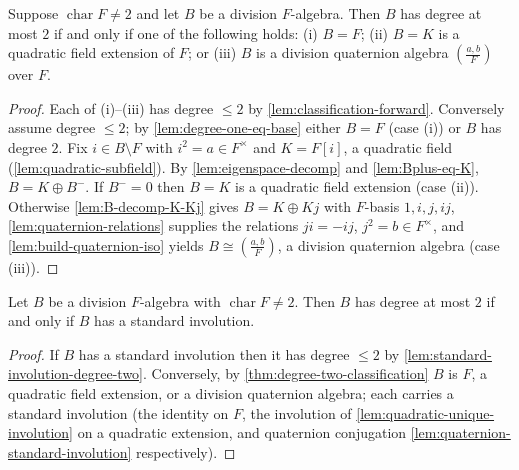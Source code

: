 \begin{theorem}
    \label{thm:degree-two-classification}
    Suppose $\operatorname{char} F \neq 2$ and let $B$ be a division $F$-algebra.
    Then $B$ has degree at most $2$ if and only if one of the following holds:
    (i) $B = F$; (ii) $B = K$ is a quadratic field extension of $F$; or
    (iii) $B$ is a division quaternion algebra $\left(\frac{a,b}{F}\right)$ over
    $F$.
\end{theorem}
\begin{proof}
    Each of (i)--(iii) has degree $\leq 2$ by \ref{lem:classification-forward}.
    Conversely assume degree $\leq 2$; by
    \ref{lem:degree-one-eq-base} either $B = F$ (case (i)) or $B$ has degree $2$.
    Fix $i \in B\setminus F$ with $i^2 = a \in F^\times$ and $K = F[i]$, a quadratic
    field (\ref{lem:quadratic-subfield}). By \ref{lem:eigenspace-decomp} and
    \ref{lem:Bplus-eq-K}, $B = K \oplus B^{-}$. If $B^{-} = 0$ then $B = K$ is a
    quadratic field extension (case (ii)). Otherwise \ref{lem:B-decomp-K-Kj} gives
    $B = K \oplus Kj$ with $F$-basis $1, i, j, ij$, \ref{lem:quaternion-relations}
    supplies the relations $ji = -ij$, $j^2 = b \in F^\times$, and
    \ref{lem:build-quaternion-iso} yields $B \cong \left(\frac{a,b}{F}\right)$, a
    division quaternion algebra (case (iii)).
\end{proof}

\begin{corollary}
    \label{cor:degree-two-iff-involution}
    Let $B$ be a division $F$-algebra with $\operatorname{char} F \neq 2$. Then
    $B$ has degree at most $2$ if and only if $B$ has a standard involution.
\end{corollary}
\begin{proof}
    If $B$ has a standard involution then it has degree $\leq 2$ by
    \ref{lem:standard-involution-degree-two}. Conversely, by
    \ref{thm:degree-two-classification} $B$ is $F$, a quadratic field extension,
    or a division quaternion algebra; each carries a standard involution (the
    identity on $F$, the involution of \ref{lem:quadratic-unique-involution} on a
    quadratic extension, and quaternion conjugation
    \ref{lem:quaternion-standard-involution} respectively).
\end{proof}

